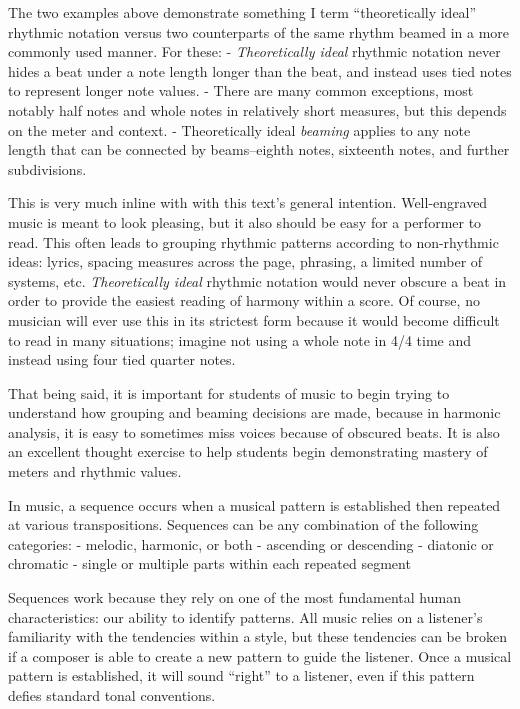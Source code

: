 \documentclass{book}
\begin{document}
The two examples above demonstrate something I term ``theoretically ideal''
rhythmic notation versus two counterparts of the same rhythm beamed in a more
commonly used manner. For these: - \emph{Theoretically ideal} rhythmic
notation never hides a beat under a note length longer than the beat, and
instead uses tied notes to represent longer note values. - There are many
common exceptions, most notably half notes and whole notes in relatively short
measures, but this depends on the meter and context. - Theoretically ideal
\emph{beaming} applies to any note length that can be connected by
beams--eighth notes, sixteenth notes, and further subdivisions.

This is very much inline with with this text's general intention.
Well-engraved music is meant to look pleasing, but it also should be easy for
a performer to read. This often leads to grouping rhythmic patterns according
to non-rhythmic ideas: lyrics, spacing measures across the page, phrasing, a
limited number of systems, etc. \emph{Theoretically ideal} rhythmic notation
would never obscure a beat in order to provide the easiest reading of harmony
within a score. Of course, no musician will ever use this in its strictest
form because it would become difficult to read in many situations; imagine not
using a whole note in 4/4 time and instead using four tied quarter notes.

That being said, it is important for students of music to begin trying to
understand how grouping and beaming decisions are made, because in harmonic
analysis, it is easy to sometimes miss voices because of obscured beats. It is
also an excellent thought exercise to help students begin demonstrating
mastery of meters and rhythmic values.

In music, a sequence occurs when a musical pattern is established then
repeated at various transpositions. Sequences can be any combination of the
following categories: - melodic, harmonic, or both - ascending or descending -
diatonic or chromatic - single or multiple parts within each repeated segment

Sequences work because they rely on one of the most fundamental human
characteristics: our ability to identify patterns. All music relies on a
listener's familiarity with the tendencies within a style, but these
tendencies can be broken if a composer is able to create a new pattern to
guide the listener. Once a musical pattern is established, it will sound
``right'' to a listener, even if this pattern defies standard tonal
conventions.
\end{document}
